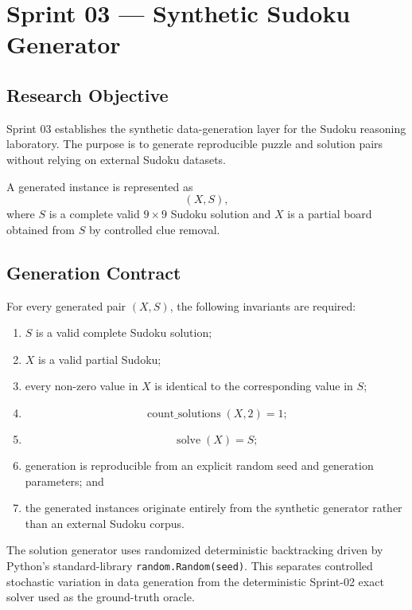 \documentclass[11pt,a4paper]{article}
\begin{document}
\section{Sprint 03 --- Synthetic Sudoku Generator}

\subsection{Research Objective}

Sprint 03 establishes the synthetic data-generation layer for the Sudoku
reasoning laboratory. The purpose is to generate reproducible puzzle and
solution pairs without relying on external Sudoku datasets.

A generated instance is represented as
\[
(X,S),
\]
where \(S\) is a complete valid \(9\times9\) Sudoku solution and \(X\) is a
partial board obtained from \(S\) by controlled clue removal.

\subsection{Generation Contract}

For every generated pair \((X,S)\), the following invariants are required:

\begin{enumerate}
    \item \(S\) is a valid complete Sudoku solution;
    \item \(X\) is a valid partial Sudoku;
    \item every non-zero value in \(X\) is identical to the corresponding
    value in \(S\);
    \item
    \[
    \operatorname{count\_solutions}(X,2)=1;
    \]
    \item
    \[
    \operatorname{solve}(X)=S;
    \]
    \item generation is reproducible from an explicit random seed and
    generation parameters; and
    \item the generated instances originate entirely from the synthetic
    generator rather than an external Sudoku corpus.
\end{enumerate}

The solution generator uses randomized deterministic backtracking driven by
Python's standard-library \texttt{random.Random(seed)}. This separates
controlled stochastic variation in data generation from the deterministic
Sprint-02 exact solver used as the ground-truth oracle.
\end{document}
